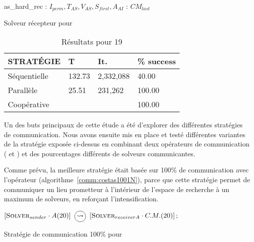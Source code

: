 \begin{algorithm}[!h]
\dontprintsemicolon
\SetNoline
{}
   as\_hard\_rec\;
\algoindent{} : $I_{perm}, T_{AS}, V_{AS}, S_{first}, A_{AI}$ \; 
\algoindent{}: $CM_{last}$\;
\caption{Solveur récepteur pour \CARRP}\label{as:costas_receiver}
\end{algorithm}

\begin{table}[!h]
\captionsetup{belowskip=6pt,aboveskip=6pt}
\centering
\renewcommand{\arraystretch}{1}
\begin{tabular}{p{3.2cm}|R{1.2cm}R{1.7cm}R{1.7cm}}
	\hline
	{\bf STRATÉGIE} & T & It. & \% success\\
	\hline
	Séquentielle  & 132.73 & 2,332,088 & 40.00\\
	Parallèle & 25.51 & 231,262 & 100.00\\
	Coopérative &  &  & 100.00\\
	\hline
\end{tabular}
\caption{Résultats pour \CARRP{} 19}
\label{tab:costas19}
\end{table}

Un des buts principaux de cette étude a été d'explorer des différentes stratégies de communication. Nous avons ensuite mis en place et testé différentes variantes de la stratégie exposée ci-dessus en combinant deux opérateurs de communication (\oneTone{} et \oneTn) et des pourcentages différents de solveurs communicantes. 

Comme prévu, la meilleure stratégie était basée sur 100\% de communication avec l'opérateur \oneTn{} (algorithme~\ref{comm:costas1001N}), parce que cette stratégie permet de communiquer un lieu prometteur à l'intérieur de l'espace de recherche à un maximum de solveurs, en refor\c{c}ant l'intensification.

\begin{algorithm}[!h]
\dontprintsemicolon
\SetNoline
$\left[\eqsolverposl{sender}\cdot A(20)\right] \oneton \left[\eqsolverposl{receiverA}\cdot C.M.(20)\right];$
\caption{Stratégie de communication \oneTn{} 100\% pour \CARRP}\label{comm:costas1001N}
\end{algorithm}




